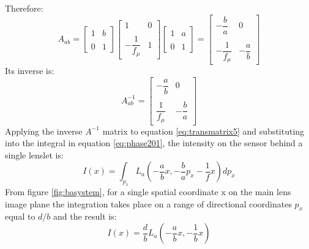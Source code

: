 Therefore:
   \begin{equation}
   \label{eq:transmatrix6}
   A_{ab}=
   \begin{bmatrix}
   1 & b \\ \\
   0 & 1
   \end{bmatrix}
   \begin{bmatrix}
  1 & 0 \\ \\
  -\dfrac{1}{f_{\mu}} & 1
   \end{bmatrix}
   \begin{bmatrix}
   
   1 & a \\ \\
   0 & 1
   \end{bmatrix}
   =
   \begin{bmatrix}
   -\dfrac{b}{a} & 0\\\\
   -\dfrac{1}{f_{\mu}}&-\dfrac{a}{b}
     \end{bmatrix}
   \end{equation}
   Its inverse is:
   \begin{equation}
   \label{eq:transmatrix7}
   A_{ab}^{-1}=
   \begin{bmatrix}
   -\dfrac{a}{b} & 0\\\\
   \dfrac{1}{f_{\mu}}&-\dfrac{b}{a}
   \end{bmatrix}
   \end{equation}
     Applying the inverse $A^{-1}$ matrix to equation \ref{eq:transmatrix5} and substituting into the integral in equation \ref{eq:phase201}, the intensity on the sensor behind a single lenslet is: 
   \begin{equation}
   \label{eq:radiance}
   	I(x)=\int_{p_x}L_a(-\dfrac{a}{b}x,-\dfrac{b}{a}p_x -\dfrac{1}{f}x) dp_x
   \end{equation}
   From figure \ref{fig:basystem}, for a single spatial coordinate x on the main lens image plane the integration takes place on a range of directional coordinates $p_x$ equal to $d/b$ and the result is:
   \begin{equation}
   \label{eq:radiance2}
   I(x)=\dfrac{d}{b}L_a(-\dfrac{a}{b}x, -\dfrac{1}{b}x) 
   \end{equation}
